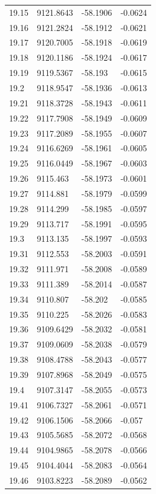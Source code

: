 \begin{table}[H]
\begin{tabular}{llll}
19.15 & 9121.8643 & -58.1906 & -0.0624 \\
19.16 & 9121.2824 & -58.1912 & -0.0621 \\
19.17 & 9120.7005 & -58.1918 & -0.0619 \\
19.18 & 9120.1186 & -58.1924 & -0.0617 \\
19.19 & 9119.5367 & -58.193 & -0.0615 \\
19.2 & 9118.9547 & -58.1936 & -0.0613 \\
19.21 & 9118.3728 & -58.1943 & -0.0611 \\
19.22 & 9117.7908 & -58.1949 & -0.0609 \\
19.23 & 9117.2089 & -58.1955 & -0.0607 \\
19.24 & 9116.6269 & -58.1961 & -0.0605 \\
19.25 & 9116.0449 & -58.1967 & -0.0603 \\
19.26 & 9115.463 & -58.1973 & -0.0601 \\
19.27 & 9114.881 & -58.1979 & -0.0599 \\
19.28 & 9114.299 & -58.1985 & -0.0597 \\
19.29 & 9113.717 & -58.1991 & -0.0595 \\
19.3 & 9113.135 & -58.1997 & -0.0593 \\
19.31 & 9112.553 & -58.2003 & -0.0591 \\
19.32 & 9111.971 & -58.2008 & -0.0589 \\
19.33 & 9111.389 & -58.2014 & -0.0587 \\
19.34 & 9110.807 & -58.202 & -0.0585 \\
19.35 & 9110.225 & -58.2026 & -0.0583 \\
19.36 & 9109.6429 & -58.2032 & -0.0581 \\
19.37 & 9109.0609 & -58.2038 & -0.0579 \\
19.38 & 9108.4788 & -58.2043 & -0.0577 \\
19.39 & 9107.8968 & -58.2049 & -0.0575 \\
19.4 & 9107.3147 & -58.2055 & -0.0573 \\
19.41 & 9106.7327 & -58.2061 & -0.0571 \\
19.42 & 9106.1506 & -58.2066 & -0.057 \\
19.43 & 9105.5685 & -58.2072 & -0.0568 \\
19.44 & 9104.9865 & -58.2078 & -0.0566 \\
19.45 & 9104.4044 & -58.2083 & -0.0564 \\
19.46 & 9103.8223 & -58.2089 & -0.0562 \\

\end{tabular}
\end{table}
